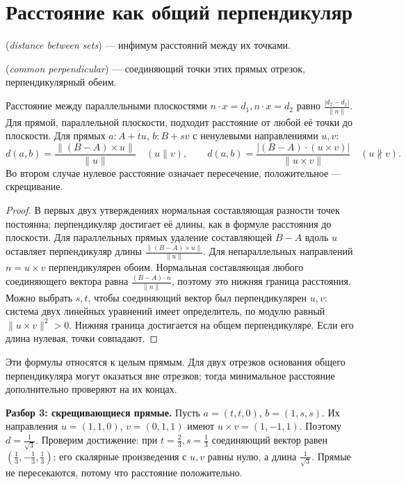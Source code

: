 \section{Расстояние как общий перпендикуляр}
\begin{definition} (\emph{distance between sets}) — инфимум расстояний между их точками.
\par{} (\emph{common perpendicular}) — соединяющий точки этих прямых отрезок, перпендикулярный обеим.\end{definition}
\begin{theorem}\label{thm:exam-solid-distances}
Расстояние между параллельными плоскостями \(n\cdot x=d_1,n\cdot x=d_2\) равно \(\frac{|d_2-d_1|}{\|n\|}\). Для прямой, параллельной плоскости, подходит расстояние от любой её точки до плоскости. Для прямых \(a:A+tu\), \(b:B+sv\) с ненулевыми направлениями \(u,v\):
\[
d(a,b)=\frac{\|(B-A)\times u\|}{\|u\|}\quad(u\parallel v),
\qquad
d(a,b)=\frac{|(B-A)\cdot(u\times v)|}{\|u\times v\|}\quad(u\not\parallel v).
\]
Во втором случае нулевое расстояние означает пересечение, положительное — скрещивание.
\end{theorem}
\begin{proof}В первых двух утверждениях нормальная составляющая разности точек постоянна; перпендикуляр достигает её длины, как в формуле расстояния до плоскости. Для параллельных прямых удаление составляющей \(B-A\) вдоль \(u\) оставляет перпендикуляр длины \(\frac{\|(B-A)\times u\|}{\|u\|}\). Для непараллельных направлений \(n=u\times v\) перпендикулярен обоим. Нормальная составляющая любого соединяющего вектора равна \(\frac{(B-A)\cdot n}{\|n\|}\), поэтому это нижняя граница расстояния. Можно выбрать \(s,t\), чтобы соединяющий вектор был перпендикулярен \(u,v\): система двух линейных уравнений имеет определитель, по модулю равный \(\|u\times v\|^2>0\). Нижняя граница достигается на общем перпендикуляре. Если его длина нулевая, точки совпадают.\end{proof}
Эти формулы относятся к целым прямым. Для двух отрезков основания общего перпендикуляра могут оказаться вне отрезков; тогда минимальное расстояние дополнительно проверяют на их концах.
\begin{example}\textbf{Разбор 3: скрещивающиеся прямые.} Пусть \(a=(t,t,0)\), \(b=(1,s,s)\). Их направления \(u=(1,1,0)\), \(v=(0,1,1)\) имеют \(u\times v=(1,-1,1)\). Поэтому \(d=\frac{1}{\sqrt{3}}\). Проверим достижение: при \(t=\frac{2}{3},s=\frac{1}{3}\) соединяющий вектор равен \((\frac{1}{3},-\frac{1}{3},\frac{1}{3})\); его скалярные произведения с \(u,v\) равны нулю, а длина \(\frac{1}{\sqrt{3}}\). Прямые не пересекаются, потому что расстояние положительно.\end{example}

